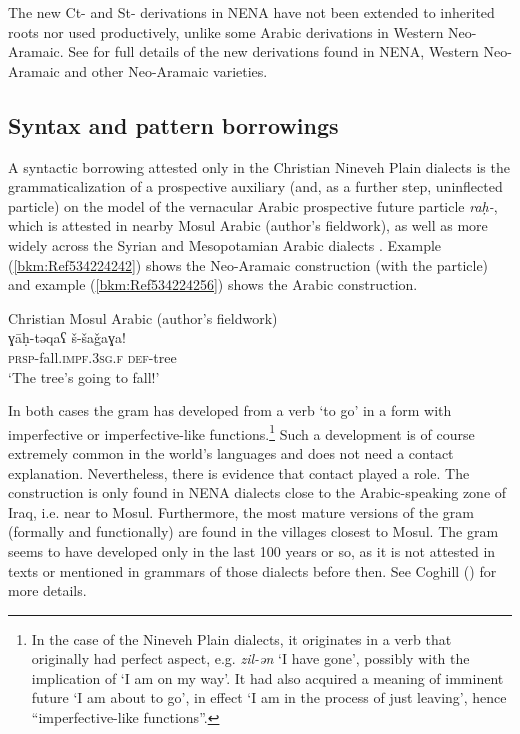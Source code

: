 \documentclass[output=paper]{langsci/langscibook}
\begin{document}
The new Ct- and St- derivations in NENA have not been extended to inherited roots nor used productively, unlike some Arabic derivations in Western Neo-Aramaic. See \citet{Coghill2015} for full details of the new derivations found in NENA, Western Neo-Aramaic and other Neo-Aramaic varieties.

\subsection{\label{bkm:Ref534214095}Syntax and pattern borrowings}

A syntactic borrowing attested only in the Christian Nineveh Plain dialects is the grammaticalization of a prospective auxiliary (and, as a further step, uninflected particle) on the model of the vernacular Arabic prospective future particle \textit{raḥ-}, which is attested in nearby Mosul Arabic (author’s fieldwork), as well as more widely across the Syrian and Mesopotamian Arabic dialects \citep[304]{Jastrow1978}. Example (\ref{bkm:Ref534224242}) shows the Neo-Aramaic construction (with the particle) and example (\ref{bkm:Ref534224256}) shows the Arabic construction.


\ea\label{bkm:Ref534224256}Christian Mosul Arabic (author’s fieldwork)\\
\gll ɣāḥ-təqaʕ š-šaǧaɣa!\\
     \textsc{prsp-}fall.\textsc{impf.3sg.f} \textsc{def}{}-tree\\
\glt ‘The tree’s going to fall!’\z

In both cases the gram has developed from a verb ‘to go’ in a form with imperfective or imperfective-like functions.\footnote{In the case of the Nineveh Plain dialects, it originates in a verb that originally had perfect aspect, e.g. \textit{zil-ən} ‘I have gone’, possibly with the implication of ‘I am on my way’. It had also acquired a meaning of imminent future ‘I am about to go’, in effect ‘I am in the process of just leaving’, hence ``imperfective-like functions''.} Such a development is of course extremely common in the world’s languages and does not need a contact explanation. Nevertheless, there is evidence that contact played a role. The construction is only found in NENA dialects close to the Arabic-speaking zone of Iraq, i.e. near to Mosul. Furthermore, the most mature versions of the gram (formally and functionally) are found in the villages closest to Mosul. The gram seems to have developed only in the last 100 years or so, as it is not attested in texts or mentioned in grammars of those dialects before then. See Coghill (\citeyear{Coghill2010,Coghill2012}) for more details.
\end{document}
